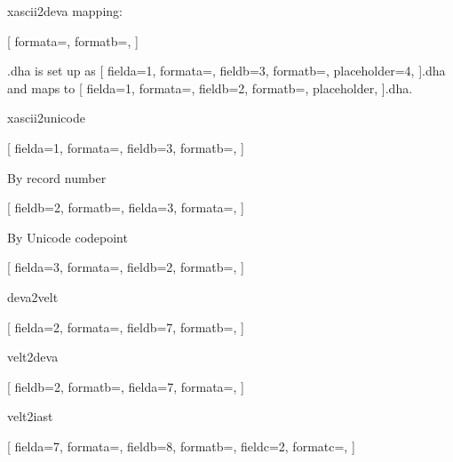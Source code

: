 \documentclass{article}
\begin{document}
xascii2deva mapping:

\setlength{\columnseprule}{0.4pt}
\begin{multicols}{4}
[
formata=,
formatb=\fdevb\Large,
]
\end{multicols}


.dha is set up as 
[
fielda=1,
formata=,
fieldb=3,
formatb=\small,
placeholder=4,
]{.dha}
and maps to
[
fielda=1,
formata=,
fieldb=2,
formatb=\fdevb,
placeholder,
]{.dha}.


\newpage
xascii2unicode

[
fielda=1,
formata=,
fieldb=3,
formatb=\small,
]


\newpage
By record number


[
fieldb=2,
formatb=\fdevb\Large,
fielda=3,
formata=\small,
]



\newpage
By Unicode codepoint


[
fielda=3,
formata=\small,
fieldb=2,
formatb=\fdevb\huge\color{blue},
]

\newpage
deva2velt


\begin{multicols}{4}
[
fielda=2,
formata=\fdevb,
fieldb=7,
formatb=\small,
]
\end{multicols}

\newpage
velt2deva



\begin{multicols}{4}
[
fieldb=2,
formatb=\fdevb,
fielda=7,
formata=\small,
]
\end{multicols}


\newpage
velt2iast



\begin{multicols}{4}
[
fielda=7,
formata=\small,
fieldb=8,
formatb=\fipa,
fieldc=2,
formatc=\fdevb,
]
\end{multicols}
\end{document}
